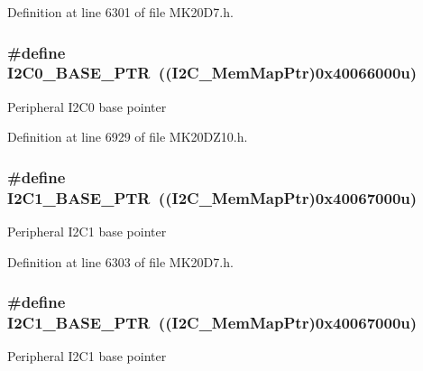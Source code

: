Definition at line 6301 of file M\+K20\+D7.\+h.

\subsubsection[{\texorpdfstring{I2\+C0\+\_\+\+B\+A\+S\+E\+\_\+\+P\+TR}{I2C0_BASE_PTR}}]{\setlength{\rightskip}{0pt plus 5cm}\#define I2\+C0\+\_\+\+B\+A\+S\+E\+\_\+\+P\+TR~(({\bf I2\+C\+\_\+\+Mem\+Map\+Ptr})0x40066000u)}\hypertarget{group___i2_c___peripheral_ga6db92fda81fa3b6a1c8c6a85e66d51a0}{}\label{group___i2_c___peripheral_ga6db92fda81fa3b6a1c8c6a85e66d51a0}
Peripheral I2\+C0 base pointer 

Definition at line 6929 of file M\+K20\+D\+Z10.\+h.

\subsubsection[{\texorpdfstring{I2\+C1\+\_\+\+B\+A\+S\+E\+\_\+\+P\+TR}{I2C1_BASE_PTR}}]{\setlength{\rightskip}{0pt plus 5cm}\#define I2\+C1\+\_\+\+B\+A\+S\+E\+\_\+\+P\+TR~(({\bf I2\+C\+\_\+\+Mem\+Map\+Ptr})0x40067000u)}\hypertarget{group___i2_c___peripheral_gae13da5d584f2a4e2379db927a3f18772}{}\label{group___i2_c___peripheral_gae13da5d584f2a4e2379db927a3f18772}
Peripheral I2\+C1 base pointer 

Definition at line 6303 of file M\+K20\+D7.\+h.

\subsubsection[{\texorpdfstring{I2\+C1\+\_\+\+B\+A\+S\+E\+\_\+\+P\+TR}{I2C1_BASE_PTR}}]{\setlength{\rightskip}{0pt plus 5cm}\#define I2\+C1\+\_\+\+B\+A\+S\+E\+\_\+\+P\+TR~(({\bf I2\+C\+\_\+\+Mem\+Map\+Ptr})0x40067000u)}\hypertarget{group___i2_c___peripheral_gae13da5d584f2a4e2379db927a3f18772}{}\label{group___i2_c___peripheral_gae13da5d584f2a4e2379db927a3f18772}
Peripheral I2\+C1 base pointer 

